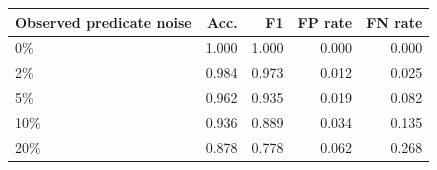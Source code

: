 \begin{tabular}{lrrrr}
\hline
Observed predicate noise & Acc. & F1 & FP rate & FN rate \\
\hline
0\% & 1.000 & 1.000 & 0.000 & 0.000 \\
2\% & 0.984 & 0.973 & 0.012 & 0.025 \\
5\% & 0.962 & 0.935 & 0.019 & 0.082 \\
10\% & 0.936 & 0.889 & 0.034 & 0.135 \\
20\% & 0.878 & 0.778 & 0.062 & 0.268 \\
\hline
\end{tabular}
